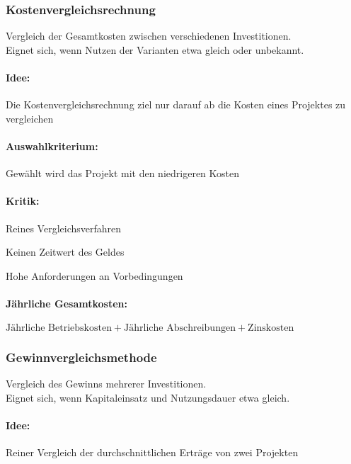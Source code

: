 
\clearpage
\subsubsection{Kostenvergleichsrechnung}
Vergleich der Gesamtkosten zwischen verschiedenen Investitionen.\\
Eignet sich, wenn Nutzen der Varianten etwa gleich oder unbekannt.

\paragraph{Idee:} Die Kostenvergleichsrechnung ziel nur darauf ab die Kosten eines Projektes zu vergleichen

\paragraph{Auswahlkriterium:} Gewählt wird das Projekt mit den niedrigeren Kosten

\paragraph{Kritik:}
\begin{compactitem}
	\item Reines Vergleichsverfahren
	\item Keinen Zeitwert des Geldes
	\item Hohe Anforderungen an Vorbedingungen
\end{compactitem}

\paragraph{Jährliche Gesamtkosten:} $\text{Jährliche Betriebskosten} + \text{Jährliche Abschreibungen} + \text{Zinskosten}$

\clearpage
\subsubsection{Gewinnvergleichsmethode}
Vergleich des Gewinns mehrerer Investitionen.\\
Eignet sich, wenn Kapitaleinsatz und Nutzungsdauer etwa gleich.

\paragraph{Idee:} Reiner Vergleich der durchschnittlichen Erträge von zwei Projekten

